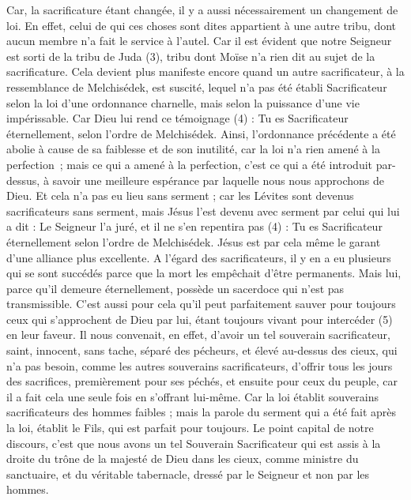 \begin{multicols}{2}
Car, la sacrificature étant changée, il y a aussi nécessairement un changement de loi.
En effet, celui de qui ces choses sont dites appartient à une autre tribu, dont aucun membre n'a fait le service à l'autel.
Car il est évident que notre Seigneur est sorti de la tribu de Juda (3), tribu dont Moïse n'a rien dit au sujet de la sacrificature.
Cela devient plus manifeste encore quand un autre sacrificateur, à la ressemblance de Melchisédek, est suscité,
lequel n'a pas été établi Sacrificateur selon la loi d’une ordonnance charnelle, mais selon la puissance d’une vie impérissable.
Car Dieu lui rend ce témoignage (4) : Tu es Sacrificateur éternellement, selon l'ordre de Melchisédek.
Ainsi, l’ordonnance précédente a été abolie à cause de sa faiblesse et de son inutilité,
car la loi n’a rien amené à la perfection ; mais ce qui a amené à la perfection, c’est ce qui a été introduit par-dessus, à savoir une meilleure espérance par laquelle nous nous approchons de Dieu.
Et cela n’a pas eu lieu sans serment ;
car les Lévites sont devenus sacrificateurs sans serment, mais Jésus l’est devenu avec serment par celui qui lui a dit : Le Seigneur l'a juré, et il ne s'en repentira pas (4) : Tu es Sacrificateur éternellement selon l'ordre de Melchisédek.
Jésus est par cela même le garant d’une alliance plus excellente.
A l’égard des sacrificateurs, il y en a eu plusieurs qui se sont succédés parce que la mort les empêchait d’être permanents.
Mais lui, parce qu'il demeure éternellement, possède un sacerdoce qui n’est pas transmissible.
C'est aussi pour cela qu’il peut parfaitement sauver pour toujours ceux qui s'approchent de Dieu par lui, étant toujours vivant pour intercéder (5) en leur faveur.
Il nous convenait, en effet, d'avoir un tel souverain sacrificateur, saint, innocent, sans tache, séparé des pécheurs, et élevé au-dessus des cieux,
qui n’a pas besoin, comme les autres souverains sacrificateurs, d'offrir tous les jours des sacrifices, premièrement pour ses péchés, et ensuite pour ceux du peuple, car il a fait cela une seule fois en s’offrant lui-même.
Car la loi établit souverains sacrificateurs des hommes faibles ; mais la parole du serment qui a été fait après la loi, établit le Fils, qui est parfait pour toujours.
\VerseOne{}Le point capital de notre discours, c'est que nous avons un tel Souverain Sacrificateur qui est assis à la droite du trône de la majesté de Dieu dans les cieux,
comme ministre du sanctuaire, et du véritable tabernacle, dressé par le Seigneur et non par les hommes.

\end{multicols}
